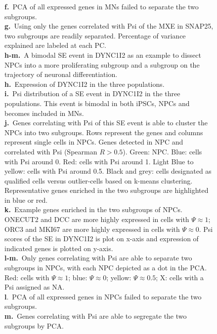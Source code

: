\begin{figure}[h]
{\textbf{f.}~PCA of all expressed genes in MNs failed to separate the two subgroups.\\
\textbf{g.}~Using only the genes correlated with Psi of the MXE in SNAP25, two subgroups are readily separated. Percentage of variance explained are labeled at each PC.\\
\textbf{h-m.}~A bimodal SE event in DYNC1I2 as an example to dissect NPCs into a more proliferating subgroup and a subgroup on the trajectory of neuronal differentiation.\\
\textbf{h.}~Expression of DYNC1I2 in the three populations.\\
\textbf{i.}~Psi distribution of a SE event in DYNC1I2 in the three populations. This event is bimodal in both iPSCs, NPCs and becomes included in MNs.\\
\textbf{j.}~Genes correlating with Psi of this SE event is able to cluster the NPCs into two subgroups. Rows represent the genes and columns represent single cells in NPCs. Genes detected in NPC and correlated with Psi (Spearman $R > 0.5$). Green: NPC. Blue: cells with Psi around 0. Red: cells with Psi around 1. Light Blue to yellow: cells with Psi around 0.5. Black and grey: cells designated as qualified cells versus outlier-cells based on k-means clustering. Representative genes enriched in the two subgroups are highlighted in blue or red. \\
\textbf{k.}~Example genes enriched in the two subgroups of NPCs. ONECUT2 and DCC are more highly expressed in cells with $\Psi \approx 1$; ORC3 and MKI67 are more highly expressed in cells with $\Psi \approx 0$. Psi scores of the SE in DYNC1I2 is plot on x-axis and expression of indicated genes is plotted on y-axis.\\
\textbf{l-m.}~Only genes correlating with Psi are able to separate two subgroups in NPCs, with each NPC depicted as a dot in the PCA. Red: cells with $\Psi \approx 1$; blue: $\Psi \approx 0$; yellow: $\Psi \approx 0.5$; X: cells with a Psi assigned as NA. \\
\textbf{l}.~PCA of all expressed genes in NPCs failed to separate the two subgroups.\\
\textbf{m.}~Genes correlating with Psi are able to segregate the two subgroups by PCA.
}
\label{fig:hidden_cell_states}
\end{figure}
\clearpage
